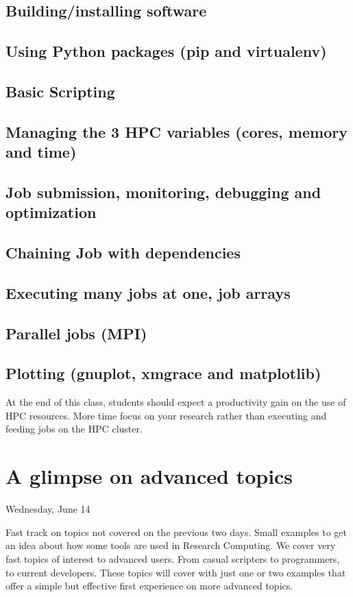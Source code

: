 \documentclass[letterpaper,twoside]{srcbook}
\begin{document}
\section{Building/installing software}
\section{Using Python packages (pip and virtualenv)}
\section{Basic Scripting}
\section{Managing the 3 HPC variables (cores, memory and time)}
\section{Job submission, monitoring, debugging and optimization}
\section{Chaining Job with dependencies}
\section{Executing many jobs at one, job arrays}
\section{Parallel jobs (MPI)}
\section{Plotting (gnuplot, xmgrace and matplotlib)}

At the end of this class, students should expect a productivity gain on the use of HPC resources. More time focus on your research rather than executing and feeding jobs on the HPC cluster.

\chapter{A glimpse on advanced topics}

Wednesday, June 14

Fast track on topics not covered on the previous two days. Small examples to get an idea about how some tools are used in Research Computing. We cover very fast topics of interest to advanced users. From casual scripters to programmers, to current developers. These topics will cover with just one or two examples that offer a simple but effective first experience on more advanced topics.
\end{document}
